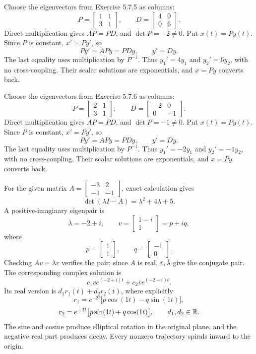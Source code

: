 Choose the eigenvectors from Exercise 5.7.5 as columns:
\[P=\left[\begin{matrix}1 & 1\\3 & 1\end{matrix}\right],\qquad D=\left[\begin{matrix}4 & 0\\0 & 6\end{matrix}\right].\]
Direct multiplication gives $AP=PD$, and $\det P=-2\ne0$.
Put $x(t)=Py(t)$. Since $P$ is constant, $x'=Py'$, so
\[Py'=APy=PDy,\qquad y'=Dy.\]
The last equality uses multiplication by $P^{-1}$.
Thus $y_1'=4y_1$ and
$y_2'=6y_2$, with no cross-coupling.
Their scalar solutions are exponentials, and $x=Py$ converts back.

Choose the eigenvectors from Exercise 5.7.6 as columns:
\[P=\left[\begin{matrix}2 & 1\\3 & 1\end{matrix}\right],\qquad D=\left[\begin{matrix}-2 & 0\\0 & -1\end{matrix}\right].\]
Direct multiplication gives $AP=PD$, and $\det P=-1\ne0$.
Put $x(t)=Py(t)$. Since $P$ is constant, $x'=Py'$, so
\[Py'=APy=PDy,\qquad y'=Dy.\]
The last equality uses multiplication by $P^{-1}$.
Thus $y_1'=-2y_1$ and
$y_2'=-1y_2$, with no cross-coupling.
Their scalar solutions are exponentials, and $x=Py$ converts back.

For the given matrix $A=\left[\begin{matrix}-3 & 2\\-1 & -1\end{matrix}\right]$, exact calculation gives
\[\det(\lambda I-A)=\lambda^{2} + 4 \lambda + 5.\]
A positive-imaginary eigenpair is
\[\lambda=-2 + i,\qquad v=\left[\begin{matrix}1 - i\\1\end{matrix}\right]=p+iq,\]
where
\[p=\left[\begin{matrix}1\\1\end{matrix}\right],\qquad q=\left[\begin{matrix}-1\\0\end{matrix}\right].\]
Checking $Av=\lambda v$ verifies the pair; since $A$ is real,
$\overline v,\overline\lambda$ give the conjugate pair.
The corresponding complex solution is
\[c_1ve^{(-2 + i)t}+c_2\overline v e^{(-2 - i)t}.
\]
Its real version is $d_1r_1(t)+d_2r_2(t)$, where explicitly
\[r_1=e^{-2t}\bigl[p\cos(1t)-q\sin(1t)\bigr],\]
\[r_2=e^{-2t}\bigl[p\sin(1t)+q\cos(1t)\bigr],\qquad d_1,d_2\in\mathbb{R}.\]
The sine and cosine produce elliptical rotation in the original plane,
and the negative real part produces decay. Every nonzero
trajectory spirals inward to the origin.

